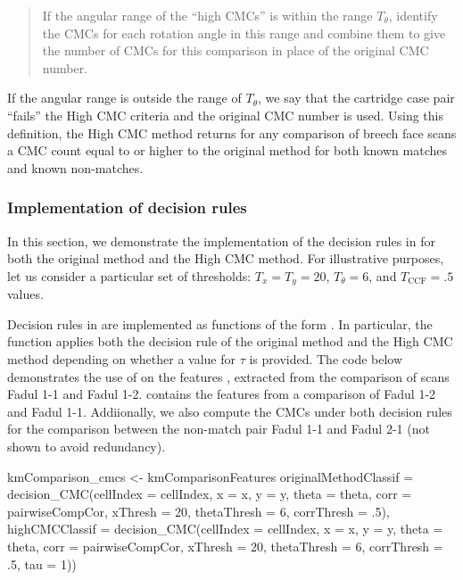 \begin{quote}
If the angular range of the ``high CMCs'' is within the range
\(T_\theta\), identify the CMCs for each rotation angle in this range
and combine them to give the number of CMCs for this comparison in place
of the original CMC number.
\end{quote}

If the angular range is outside the range of \(T_\theta\), we say that
the cartridge case pair ``fails'' the High CMC criteria and the original
CMC number is used. Using this definition, the High CMC method returns
for any comparison of breech face scans a CMC count equal to or higher
to the original method for both known matches and known non-matches.

\hypertarget{decisionRuleImplementation}{%
\subsubsection{Implementation of decision
rules}\label{decisionRuleImplementation}}

In this section, we demonstrate the implementation of the decision rules
in  for both the original method and the High CMC method.
For illustrative purposes, let us consider a particular set of
thresholds: \(T_x = T_y = 20\), \(T_{\theta} = 6\), and
\(T_{\text{CCF}} = .5\) values.

Decision rules in  are implemented as functions of the
form . In particular, the 
function applies both the decision rule of the original method and the
High CMC method depending on whether a value for \(\tau\) is provided.
The code below demonstrates the use of  on the
features , extracted from the comparison of
scans Fadul 1-1 and Fadul 1-2.  contains
the features from a comparison of Fadul 1-2 and Fadul 1-1. Addiionally,
we also compute the CMCs under both decision rules for the comparison
between the non-match pair Fadul 1-1 and Fadul 2-1 (not shown to avoid
redundancy).

\begin{Schunk}
\begin{Sinput}
kmComparison_cmcs <- kmComparisonFeatures %
  originalMethodClassif = 
    decision_CMC(cellIndex = cellIndex, x = x, y = y, theta = theta,
                 corr = pairwiseCompCor, xThresh = 20, thetaThresh = 6,
                 corrThresh = .5),
  highCMCClassif = 
    decision_CMC(cellIndex = cellIndex, x = x, y = y, theta = theta,
                 corr = pairwiseCompCor, xThresh = 20, thetaThresh = 6,
                 corrThresh = .5, tau = 1))
\end{Sinput}
\end{Schunk}

